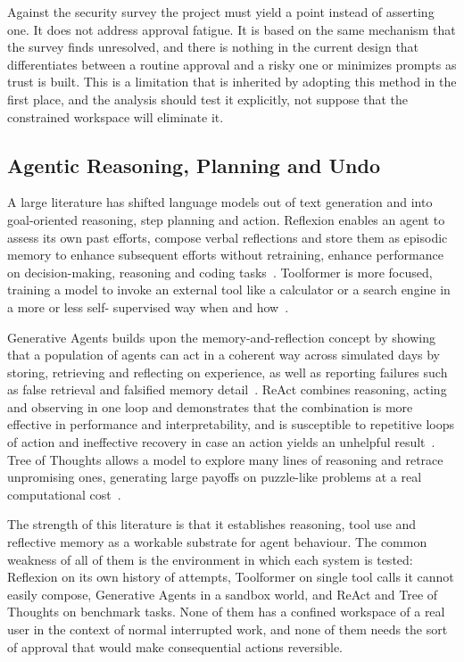 \documentclass{FastFyp}
\begin{document}
Against the security survey the project must yield a point instead of asserting one. It does not address approval fatigue. It is based on the same mechanism that the survey finds unresolved, and there is nothing in the current design that differentiates between a routine approval and a risky one or minimizes prompts as trust is built. This is a limitation that is inherited by adopting this method in the first place, and the analysis should test it explicitly, not suppose that the constrained workspace will eliminate it.

\subsection{Agentic Reasoning, Planning and Undo}
A large literature has shifted language models out of text generation and into goal-oriented reasoning, step planning and action. Reflexion enables an agent to assess its own past efforts, compose verbal reflections and store them as episodic memory to enhance subsequent efforts without retraining, enhance performance on decision-making, reasoning and coding tasks~\cite{ref:shinn2023}. Toolformer is more focused, training a model to invoke an external tool like a calculator or a search engine in a more or less self- supervised way when and how~\cite{ref:schick2023}.

Generative Agents builds upon the memory-and-reflection concept by showing that a population of agents can act in a coherent way across simulated days by storing, retrieving and reflecting on experience, as well as reporting failures such as false retrieval and falsified memory detail~\cite{ref:park2023}. ReAct combines reasoning, acting and observing in one loop and demonstrates that the combination is more effective in performance and interpretability, and is susceptible to repetitive loops of action and ineffective recovery in case an action yields an unhelpful result~\cite{ref:yao2023react}. Tree of Thoughts allows a model to explore many lines of reasoning and retrace unpromising ones, generating large payoffs on puzzle-like problems at a real computational cost~\cite{ref:yao2023tot}.

The strength of this literature is that it establishes reasoning, tool use and reflective memory as a workable substrate for agent behaviour. The common weakness of all of them is the environment in which each system is tested: Reflexion on its own history of attempts, Toolformer on single tool calls it cannot easily compose, Generative Agents in a sandbox world, and ReAct and Tree of Thoughts on benchmark tasks. None of them has a confined workspace of a real user in the context of normal interrupted work, and none of them needs the sort of approval that would make consequential actions reversible.
\end{document}
